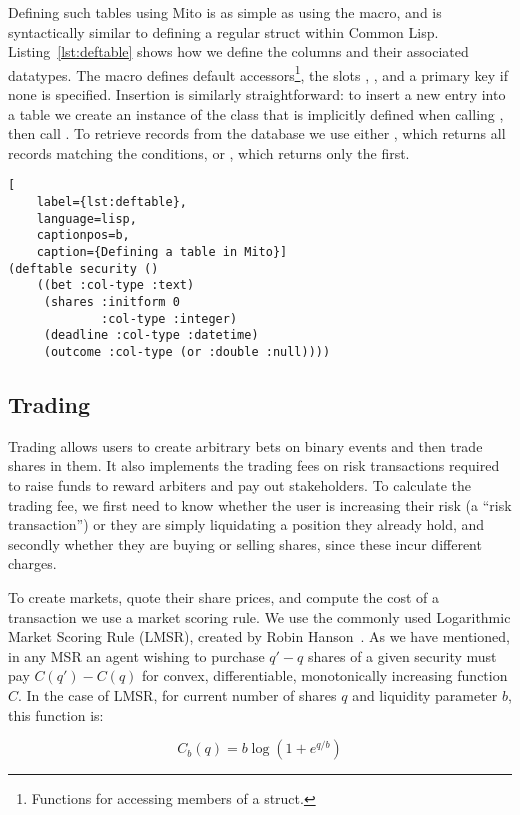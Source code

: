 Defining such tables using Mito is as simple as using the 
macro, and is syntactically similar to defining a regular struct within Common
Lisp. Listing~\ref{lst:deftable} shows how we define the columns and their
associated datatypes. The macro defines default accessors\footnote{Functions
for accessing members of a struct.}, the slots ,
, and a primary key  if none is specified. Insertion
is similarly straightforward: to insert a new entry into a table we create an
instance of the class that is implicitly defined when calling ,
then call . To retrieve records from the database we use
either , which returns all records matching the conditions, or
, which returns only the first.

\begin{lstlisting}[
	label={lst:deftable},
	language=lisp,
	captionpos=b,
	caption={Defining a table in Mito}]
(deftable security ()
    ((bet :col-type :text)
     (shares :initform 0
             :col-type :integer)
     (deadline :col-type :datetime)
     (outcome :col-type (or :double :null))))
\end{lstlisting}

\subsection{Trading}

Trading allows users to create arbitrary bets on binary events and then trade
shares in them. It also implements the trading fees on risk transactions
required to raise funds to reward arbiters and pay out stakeholders. To
calculate the trading fee, we first need to know whether the user is increasing
their risk (a ``risk transaction'') or they are simply liquidating a position
they already hold, and secondly whether they are buying or selling shares,
since these incur different charges.

To create markets, quote their share prices, and compute the cost of a
transaction we use a market scoring rule. We use the commonly used Logarithmic
Market Scoring Rule (LMSR), created by Robin Hanson~\cite{LMSR}. As we have
mentioned, in any MSR an agent wishing to purchase $q'-q$ shares of a given
security must pay $C(q')-C(q)$ for convex, differentiable, monotonically
increasing function $C$. In the case of LMSR, for current number of shares $q$
and liquidity parameter $b$, this function is:

\begin{equation}
	\label{eq:LMSR}
	C_b(q) = b \log (1 + e^{q/b})
\end{equation}

